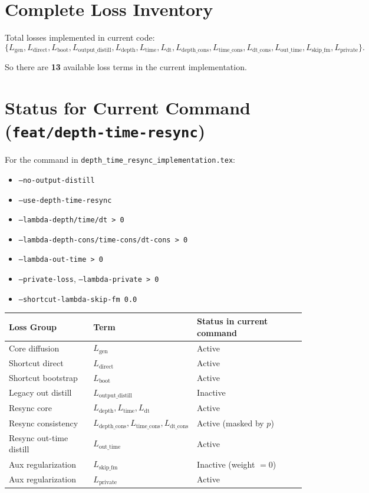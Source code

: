 \documentclass[11pt]{article}
\begin{document}
\section{Complete Loss Inventory}

Total losses implemented in current code:
\[
\{L_{\text{gen}},L_{\text{direct}},L_{\text{boot}},L_{\text{output\_distill}},
L_{\text{depth}},L_{\text{time}},L_{\text{dt}},
L_{\text{depth\_cons}},L_{\text{time\_cons}},L_{\text{dt\_cons}},
L_{\text{out\_time}},L_{\text{skip\_fm}},L_{\text{private}}\}.
\]

So there are \textbf{13} available loss terms in the current implementation.

\section{Status for Current Command (\texttt{feat/depth-time-resync})}

For the command in \texttt{depth\_time\_resync\_implementation.tex}:
\begin{itemize}[leftmargin=*]
  \item \texttt{--no-output-distill}
  \item \texttt{--use-depth-time-resync}
  \item \texttt{--lambda-depth/time/dt > 0}
  \item \texttt{--lambda-depth-cons/time-cons/dt-cons > 0}
  \item \texttt{--lambda-out-time > 0}
  \item \texttt{--private-loss}, \texttt{--lambda-private > 0}
  \item \texttt{--shortcut-lambda-skip-fm 0.0}
\end{itemize}

\begin{center}
\begin{tabular}{lll}
\toprule
Loss Group & Term & Status in current command \\
\midrule
Core diffusion & \(L_{\text{gen}}\) & Active \\
Shortcut direct & \(L_{\text{direct}}\) & Active \\
Shortcut bootstrap & \(L_{\text{boot}}\) & Active \\
Legacy out distill & \(L_{\text{output\_distill}}\) & Inactive \\
Resync core & \(L_{\text{depth}},L_{\text{time}},L_{\text{dt}}\) & Active \\
Resync consistency & \(L_{\text{depth\_cons}},L_{\text{time\_cons}},L_{\text{dt\_cons}}\) & Active (masked by \(p\)) \\
Resync out-time distill & \(L_{\text{out\_time}}\) & Active \\
Aux regularization & \(L_{\text{skip\_fm}}\) & Inactive (weight \(=0\)) \\
Aux regularization & \(L_{\text{private}}\) & Active \\
\bottomrule
\end{tabular}
\end{center}
\end{document}
